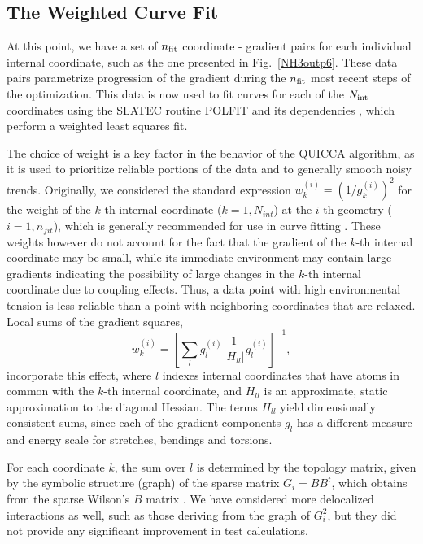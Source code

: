 \documentclass[prl,twocolumn,showpacs,twocolumngrid,superbib]{revtex4}
\begin{document}
\subsection{The Weighted Curve Fit} \label{Sweights}

At this point,  we have a set of $n_{\rm fit}$ coordinate - gradient pairs for each individual 
internal coordinate, such as the one presented in Fig.~\ref{NH3outp6}. These data 
pairs parametrize progression of the gradient during the $n_{\rm fit}$ most recent steps of the 
optimization.  This data is now used to fit curves for each of the $N_{\rm int}$ coordinates using the 
{\sc SLATEC} routine {\sc POLFIT} and its dependencies \cite{Slatec93}, which perform a weighted least squares fit.

The choice of weight is a key factor in the behavior of the QUICCA algorithm, as it is used to prioritize 
reliable portions of the data and to generally smooth noisy trends.  
Originally, we considered the standard expression $w_{k}^{(i)}=(1/{g_{k}^{(i)}})^2$ for the weight 
of the $k$-th internal coordinate ($k=1,N_{int}$) at the $i$-th geometry
($i=1,n_{fit}$), which is generally recommended for use in curve 
fitting \cite{WPress92}.  These weights however do not 
account for the fact that the gradient of the $k$-th internal coordinate may be small, while 
its immediate  environment may contain large gradients indicating the possibility of large changes in the $k$-th 
internal coordinate due to coupling effects.  Thus, a data point with high environmental tension 
is less reliable than a point with neighboring coordinates that are relaxed.   
Local sums of the gradient squares,
\begin{equation}
\label{weights}
w_{k}^{(i)} = \left[ \sum_{l} g_{l}^{(i)} \frac{1}{|H_{ll}^{}|} g_{l}^{(i)} \right]^{-1} ,
\end{equation}
incorporate this effect, where  $l$ indexes internal coordinates that have atoms in common with 
the $k$-th internal coordinate, and $H_{ll}^{}$ is an approximate, static approximation to the 
diagonal Hessian.  The terms $H_{ll}$ yield dimensionally consistent sums, since each of the gradient 
components  $g_{l}$ has a different measure and energy scale for stretches, bendings and torsions.  

For each coordinate $k$, the sum over $l$ is determined by the topology matrix, given by the symbolic 
structure (graph) of the sparse matrix $G_{i}=BB^{t}$, which obtains from the sparse Wilson's $B$ 
matrix \cite{EWilson55}.  We have considered more delocalized interactions as well, such as those deriving 
from the graph of $G_i^2$, but they did not provide any significant improvement in test calculations.
\end{document}
